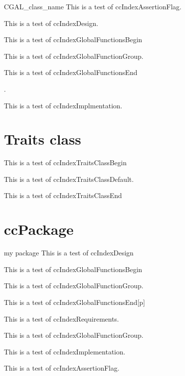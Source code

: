 \documentclass{article}
\begin{document}
{{{{\begin{ccIndexClass}{CGAL_class_name}
This is a test of ccIndexAssertionFlag.

This is a test of ccIndexDesign\ccIndexDesign.

This is a test of ccIndexGlobalFunctionsBegin
\begin{ccIndexGlobalFunctions}

This is a test of ccIndexGlobalFunctionGroup.

\pagebreak

This is a test of ccIndexGlobalFunctionsEnd
\end{ccIndexGlobalFunctions}.

This is a test of ccIndexImplmentation\ccIndexImplementation.
\end{ccIndexClass}

\section{Traits class}
This is a test of ccIndexTraitsClassBegin

This is a test of ccIndexTraitsClassDefault\ccIndexTraitsClassDefault.

This is a test of ccIndexTraitsClassEnd
\ccIndexTraitsClassEnd

\section{ccPackage}

\begin{ccPackage}{my package}
This is a test of ccIndexDesign\ccIndexDesign%

\begin{ccIndexGlobalFunctions}
This is a test of ccIndexGlobalFunctionsBegin

This is a test of ccIndexGlobalFunctionGroup.

This is a test of ccIndexGlobalFunctionsEnd[p]
\end{ccIndexGlobalFunctions}

This is a test of ccIndexRequirements\ccIndexRequirements.

This is a test of ccIndexGlobalFunctionGroup.

This is a test of ccIndexImplementation\ccIndexImplementation.

This is a test of ccIndexAssertionFlag\ccIndexAssertionFlag.


\end{ccPackage}}}}}
\end{document}
